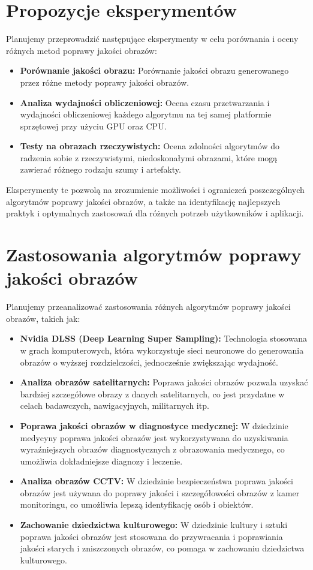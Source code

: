 \documentclass[10pt]{article}
\begin{document}
\section*{Propozycje eksperymentów}
Planujemy przeprowadzić następujące eksperymenty w celu porównania i oceny różnych metod poprawy jakości obrazów:
\begin{itemize}
    \item \textbf{Porównanie jakości obrazu:} Porównanie jakości obrazu generowanego przez różne metody poprawy jakości obrazów.
    \item \textbf{Analiza wydajności obliczeniowej:} Ocena czasu przetwarzania i wydajności obliczeniowej każdego algorytmu na tej samej platformie sprzętowej przy użyciu GPU oraz CPU.
    \item \textbf{Testy na obrazach rzeczywistych:} Ocena zdolności algorytmów do radzenia sobie z rzeczywistymi, niedoskonałymi obrazami, które mogą zawierać różnego rodzaju szumy i artefakty.
\end{itemize}
Eksperymenty te pozwolą na zrozumienie możliwości i ograniczeń poszczególnych algorytmów poprawy jakości obrazów, a także na identyfikację najlepszych praktyk i optymalnych zastosowań dla różnych potrzeb użytkowników i aplikacji.

\newpage
\section*{Zastosowania algorytmów poprawy jakości obrazów}
Planujemy przeanalizować zastosowania różnych algorytmów poprawy jakości obrazów, takich jak:
\begin{itemize}
    \item \textbf{Nvidia DLSS (Deep Learning Super Sampling):} Technologia stosowana w grach komputerowych, która wykorzystuje sieci neuronowe do generowania obrazów o wyższej rozdzielczości, jednocześnie zwiększając wydajność.
    \item \textbf{Analiza obrazów satelitarnych:} Poprawa jakości obrazów pozwala uzyskać bardziej szczegółowe obrazy z danych satelitarnych, co jest przydatne w celach badawczych, nawigacyjnych, militarnych itp.
    \item \textbf{Poprawa jakości obrazów w diagnostyce medycznej:} W dziedzinie medycyny poprawa jakości obrazów jest wykorzystywana do uzyskiwania wyraźniejszych obrazów diagnostycznych z obrazowania medycznego, co umożliwia dokładniejsze diagnozy i leczenie.
    \item \textbf{Analiza obrazów CCTV:} W dziedzinie bezpieczeństwa poprawa jakości obrazów jest używana do poprawy jakości i szczegółowości obrazów z kamer monitoringu, co umożliwia lepszą identyfikację osób i obiektów.
    \item \textbf{Zachowanie dziedzictwa kulturowego:} W dziedzinie kultury i sztuki poprawa jakości obrazów jest stosowana do przywracania i poprawiania jakości starych i zniszczonych obrazów, co pomaga w zachowaniu dziedzictwa kulturowego.
\end{itemize}
\end{document}

